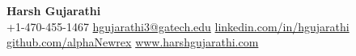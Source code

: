 \begin{center}
    \textbf{\Large Harsh Gujarathi}\\[0.25em]
    {\small
        +1-470-455-1467
        \;\textbar\; \href{mailto:hgujarathi3@gatech.edu}{hgujarathi3@gatech.edu}
        \;\textbar\; \href{https://www.linkedin.com/in/hgujarathi}{linkedin.com/in/hgujarathi}
        \;\textbar\; \href{https://github.com/alphaNewrex}{github.com/alphaNewrex}
        \;\textbar\; \href{https://www.harshgujarathi.com}{www.harshgujarathi.com}
    }
\end{center}
\vspace{-0.5em}

